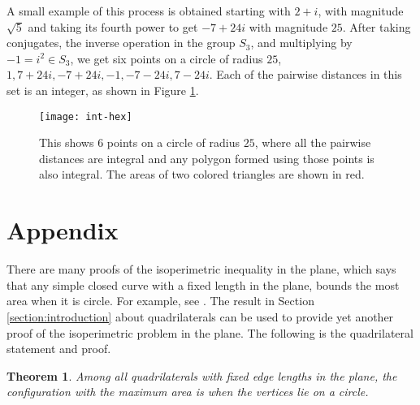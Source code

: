 \documentclass[11pt]{article}
\newtheorem{theorem}{Theorem}[section]
\numberwithin{equation}{section}
\numberwithin{figure}{section}
\begin{document}
A small example of this process is obtained starting with $2+i$, with magnitude $\sqrt{5}$ and taking its fourth power to get $-7 + 24i$ with magnitude $25$.  After taking conjugates, the inverse operation in the group $S_3$, and multiplying by $-1=i^2 \in S_3$, we get six points on a circle of radius $25$, $1, 7+24i, -7+24i, -1, -7-24i, 7-24i$.  Each of the pairwise distances in this set is an integer, as shown in Figure \ref{fig:int-hex}.

 \begin{figure}[!htb]
    \centering
        \texttt{[image: int-hex]}%
        \captionsetup{labelsep=colon,margin=2cm}
         \caption{This shows $6$ points on a circle of radius $25$, where all the pairwise distances are integral and any polygon formed using those  points is also integral.  The areas of two colored triangles are shown in red. }\label{fig:int-hex}
    \end{figure}
    
 
    
    \section{Appendix} \label{section:appendix}

There are many proofs of the isoperimetric inequality in the plane, which says that any simple closed curve with a fixed length in the plane, bounds the most area when it is circle.  For example, see  \cite{Niven-max-min}.  The result in Section \ref{section:introduction} about quadrilaterals can be used to provide yet another proof of the isoperimetric problem in the plane.  The following is the quadrilateral statement and proof.

\begin{theorem}\label{thm:iso-quad}  Among all quadrilaterals with fixed edge lengths in the plane, the configuration with the maximum area is when the vertices lie on a circle.
\end{theorem}  
\end{document}
